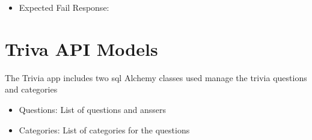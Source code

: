 \documentclass[letterpaper,10pt,english]{sphinxmanual}
\begin{document}
\begin{fulllineitems}
\begin{itemize}
\item {} 
Expected Fail Response:

\begin{sphinxVerbatim}[commandchars=\\\{\}]
   
      
     
     
\end{sphinxVerbatim}

\end{itemize}

\end{fulllineitems}



\chapter{Triva API Models}
\label{\detokenize{index:module-models}}\label{\detokenize{index:triva-api-models}}

The Trivia app includes two sql Alchemy classes used manage the trivia questions and categories
\begin{itemize}
\item {} 
Questions: List of questions and anssers

\item {} 
Categories: List of categories for the questions

\end{itemize}
\end{document}
